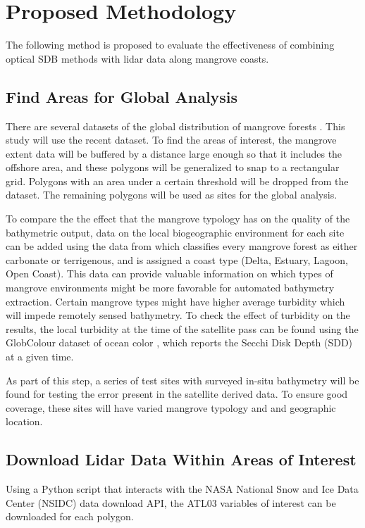 \chapter{Proposed Methodology}

The following method is proposed to evaluate the effectiveness of combining optical SDB methods with lidar data along mangrove coasts.

\section{Find Areas for Global Analysis}

There are several datasets of the global distribution of mangrove forests \parencite{Worthington2020}. This study will use the recent \cite{Giri2011b} dataset. To find the areas of interest, the mangrove extent data will be buffered by a distance large enough so that it includes the offshore area, and these polygons will be generalized to snap to a rectangular grid. Polygons with an area under a certain threshold will be dropped from the dataset. The remaining polygons will be used as sites for the global analysis.

To compare the the effect that the mangrove typology has on the quality of the bathymetric output, data on the local biogeographic environment for each site can be added using the data from \cite{Worthington2020a} which classifies every mangrove forest as either carbonate or terrigenous, and is assigned a coast type (Delta, Estuary, Lagoon, Open Coast). This data can provide valuable information on which types of mangrove environments might be more favorable for automated bathymetry extraction. Certain mangrove types might have higher average turbidity which will impede remotely sensed bathymetry. To check the effect of turbidity on the results, the local turbidity at the time of the satellite pass can be found using the GlobColour dataset of ocean color \parencite{Garnesson2019}, which reports the Secchi Disk Depth (SDD) at a given time. 

As part of this step, a series of test sites with surveyed in-situ bathymetry will be found for testing the error present in the satellite derived data. To ensure good coverage, these sites will have varied mangrove typology and and geographic location.

\section{Download Lidar Data Within Areas of Interest}
Using a Python script that interacts with the NASA National Snow and Ice Data Center (NSIDC) data download API, the ATL03 variables of interest can be downloaded for each polygon.

